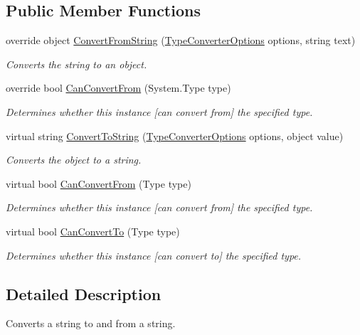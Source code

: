\subsection*{Public Member Functions}
\begin{DoxyCompactItemize}
\item 
override object \hyperlink{a00143_a50bf35ff93e01df630a9c5e3c7b7569f}{Convert\-From\-String} (\hyperlink{a00154}{Type\-Converter\-Options} options, string text)
\begin{DoxyCompactList}\small\item\em Converts the string to an object. \end{DoxyCompactList}\item 
override bool \hyperlink{a00143_a3e7f3959693638756bb98951fe8791f3}{Can\-Convert\-From} (System.\-Type type)
\begin{DoxyCompactList}\small\item\em Determines whether this instance \mbox{[}can convert from\mbox{]} the specified type. \end{DoxyCompactList}\item 
virtual string \hyperlink{a00068_a36cb2f9b24f15a671293f3a722324c27}{Convert\-To\-String} (\hyperlink{a00154}{Type\-Converter\-Options} options, object value)
\begin{DoxyCompactList}\small\item\em Converts the object to a string. \end{DoxyCompactList}\item 
virtual bool \hyperlink{a00068_a470d21adaa704eb281250dbd112ff91a}{Can\-Convert\-From} (Type type)
\begin{DoxyCompactList}\small\item\em Determines whether this instance \mbox{[}can convert from\mbox{]} the specified type. \end{DoxyCompactList}\item 
virtual bool \hyperlink{a00068_acb65bd8c8199d88d5b1629ae35d18514}{Can\-Convert\-To} (Type type)
\begin{DoxyCompactList}\small\item\em Determines whether this instance \mbox{[}can convert to\mbox{]} the specified type. \end{DoxyCompactList}\end{DoxyCompactItemize}


\subsection{Detailed Description}
Converts a string to and from a string. 



